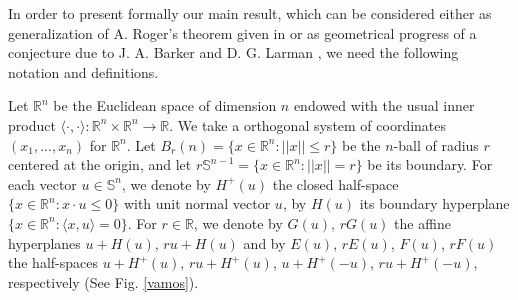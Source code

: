 \documentclass[12pt]{amsart}
\newcommand{\R}{\mathbb{R}}
\begin{document}
In order to present formally our main result, which can be con\-si\-de\-red either as generalization of  A. Roger's theorem given in \cite{ro1} or as geometrical progress of a conjecture due to J. A. Barker and D. G. Larman \cite{bl}, we need the following notation and definitions.  

Let $\mathbb{R}^{n}$ be the Euclidean space of dimension $n$ endowed with the usual inner product $\langle \cdot, \cdot\rangle : \mathbb{R}^{n} \times \mathbb{R}^{n} \rightarrow \R$. We take a orthogonal system of coordinates $(x_1,...,x_{n})$ for  $\mathbb{R}^{n}$. Let $B_r(n)=\{x\in \mathbb{R}^{n}: ||x||\leq r\}$ be the $n$-ball of radius $r$ centered  at the origin, and let $r\mathbb{S}^{n-1}=\{x\in \mathbb{R}^{n}: ||x|| = r\}$ be its boundary. For each vector $u\in \mathbb{S}^{n}$, we denote by $H^ {+}(u)$  the closed half-space $\{x \in \mathbb{R} ^{n}: x\cdot u \leq 0\}$ with unit normal vector $u$, by $H(u)$ its boundary hyperplane $\{x \in \mathbb{R} ^{n}: \langle x,  u\rangle = 0\}$. For $r\in \mathbb{R}$, we denote by $G(u)$, $rG(u)$ the affine hyperplanes $u+H(u)$, $ru+H(u)$ and by $E(u)$, $rE(u)$, $F(u)$, $rF(u)$ the half-spaces $u+H^+(u)$, $ru+H^+(u)$, $u+H^+(-u)$, $ru+H^+(-u)$, respectively (See Fig. \ref{vamos}). 
\end{document}
